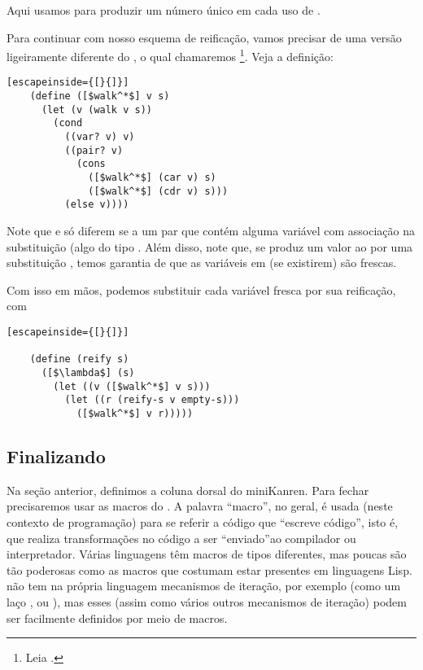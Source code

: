 \documentclass{article}
\begin{document}
  \noindent Aqui usamos  para produzir um número
  único em cada uso de .

  Para continuar com nosso esquema de reificação, vamos precisar de
  uma versão ligeiramente diferente do , o qual
  chamaremos \footnote{Leia .}. Veja a definição:
  
  \begin{lstlisting}[escapeinside={[}{]}]
    (define ([$walk^*$] v s)
      (let (v (walk v s))
        (cond
          ((var? v) v)
          ((pair? v)
            (cons
              ([$walk^*$] (car v) s)
              ([$walk^*$] (cdr v) s)))
          (else v))))
  \end{lstlisting}

  Note que  e  só diferem se
    a um par que contém alguma
  variável com associação na substituição  (algo do tipo
  . Além disso,
  note que, se  produz um valor  ao
   por uma substituição , temos
  garantia de que as variáveis em  (se existirem) são frescas.

  Com isso em mãos, podemos substituir cada variável fresca por sua
  reificação, com

  \begin{lstlisting}[escapeinside={[}{]}]

    (define (reify s)
      ([$\lambda$] (s)
        (let ((v ([$walk^*$] v s)))
          (let ((r (reify-s v empty-s)))
            ([$walk^*$] v r)))))

  \end{lstlisting}



  \subsection{Finalizando}

  Na seção anterior, definimos a coluna dorsal do miniKanren. Para
  fechar precisaremos usar as macros do . A palavra
  ``macro'', no geral, é usada (neste contexto de programação) para se
  referir a código que ``escreve código'', isto é, que realiza
  transformações no código a ser ``enviado''ao compilador ou
  interpretador. Várias linguagens têm macros de tipos diferentes, mas
  poucas são tão poderosas como as macros que costumam estar presentes
  em linguagens Lisp.  não tem na própria linguagem
  mecanismos de iteração, por exemplo (como um laço ,
  ou ), mas esses (assim como vários outros
  mecanismos de iteração) podem ser facilmente definidos por meio de
  macros.
\end{document}
